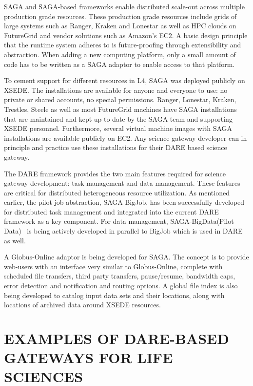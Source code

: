 \documentclass[]{svjour3}
\begin{document}
SAGA and SAGA-based frameworks enable distributed scale-out across
multiple production grade resources. These production grade resources
include grids of large systems such as Ranger, Kraken and Lonestar as
well as HPC clouds on FutureGrid and vendor solutions such as Amazon's
EC2. A basic design principle that the runtime system adheres to is
future-proofing through extensibility and abstraction. When adding a
new computing platform, only a small amount of code has to be written
as a SAGA adaptor to enable access to that platform.

To cement support for different resources in L4, SAGA was deployed
publicly on XSEDE. The installations are available for anyone and
everyone to use: no private or shared accounts, no special
permissions. Ranger, Lonestar, Kraken, Trestles, Steele as well as
most FutureGrid machines have SAGA installations that are maintained
and kept up to date by the SAGA team and supporting XSEDE
personnel. Furthermore, several virtual machine images with SAGA
installations are available publicly on EC2. Any science gateway
developer can in principle and practice use these installations for
their DARE based science gateway.

The DARE framework provides the two main features required
for science gateway development: task management and data management.
These features are critical for distributed heterogeneous resource
utilization. As mentioned earlier, the pilot
job abstraction, SAGA-BigJob, has been successfully developed for
distributed task management and integrated into the current DARE
framework as a key component. For data management, SAGA-BigData(Pilot Data)~\cite{pstar11} is
being actively developed in parallel to BigJob which is used in DARE as well.

A Globus-Online adaptor is being developed for SAGA.
The concept is to provide web-users with an interface very
similar to Globus-Online, complete with scheduled file transfers,
third party transfers, pause/resume, bandwidth caps, error detection
and notification and routing options. A global file index is also
being developed to catalog input data sets and their locations, along
with locations of archived data around XSEDE resources.


\section{EXAMPLES OF DARE-BASED GATEWAYS FOR LIFE SCIENCES}
\end{document}
